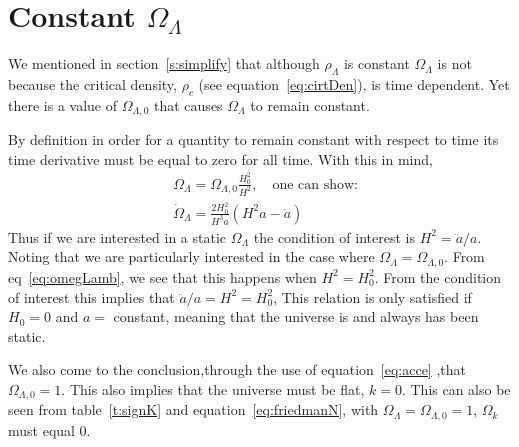 \documentclass[twoside]{article}
\begin{document}
\newpage
\appendix
\section{Constant $\Omega_{\Lambda}$}\label{a:constOmeg}
We mentioned in section~\ref{s:simplify} that although $\rho_{\Lambda}$ is constant $\Omega_{\Lambda}$ is not because the critical density, $\rho_{c}$  (see equation~\ref{eq:cirtDen}), is time dependent. Yet there is a value of $\Omega_{\Lambda,0}$ that causes $\Omega_{\Lambda}$ to remain constant.\par
By definition in order for a quantity to remain constant with respect to time its time derivative must be equal to zero for all time. With this in mind,
\begin{align}
&\Omega_{\Lambda}  = \Omega_{\Lambda,0}\frac{H^{2}_{0}}{H^{2}}, \quad \text{one can show:}\label{eq:omegLamb}\\
&\dot{\Omega}_{\Lambda} = \frac{2H^{2}_{0}}{H^{3}a}(H^2a-\ddot{a})
\end{align}
Thus if we are interested in a static $\Omega_{\Lambda}$ the condition of interest is $H^{2} = \ddot{a}/a$. Noting that we are particularly interested in the case where $\Omega_{\Lambda} = \Omega_{\Lambda,0}$. From eq~\ref{eq:omegLamb}, we see that this happens when  $H^2=H_{0}^{2}$. From the condition of interest this implies that $\ddot{a}/a= H^{2}=H^{2}_{0}$, This relation is only satisfied if $H_{0}  = 0$ and $a = $ constant, meaning that the universe is and always has been static. \par

We also come to the conclusion,through the use of equation~\ref{eq:acce} ,that $\Omega_{\Lambda,0} =1$. This also implies that the universe must be flat, $k=0$. This can also be seen from table~\ref{t:signK} and equation~\ref{eq:friedmanN}, with $\Omega_{\Lambda}=\Omega_{\Lambda,0}=1$, $\Omega_{k}$ must equal 0.


\end{document}

